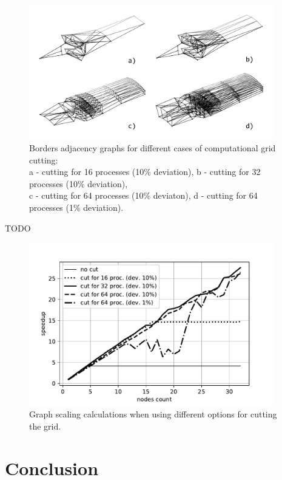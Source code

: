 \documentclass[
11pt,%
tightenlines,%
twoside,%
onecolumn,%
nofloats,%
nobibnotes,%
nofootinbib,%
superscriptaddress,%
noshowpacs,%
centertags]%
{revtex4}
\begin{document}
\begin{figure}[h]
\setcaptionmargin{5mm}
\onelinecaptionsfalse
\includegraphics[width=0.95\textwidth]{pics/g_36_2.pdf}
\caption{Borders adjacency graphs for different cases of computational grid cutting: \\ a - cutting for 16 processes (10\% deviation), b - cutting for 32 processes (10\% deviation), \\ c - cutting for 64 processes (10\% deviaton), d - cutting for 64 processes (1\% deviation).}
\label{fig:g_36_2}
\end{figure}

TODO

\begin{figure}[h]
\setcaptionmargin{5mm}
\onelinecaptionstrue
\includegraphics[width=0.95\textwidth]{pics/plot_36_scaling_2.pdf}
\caption{Graph scaling calculations when using different options for cutting the grid.}
\label{fig:plot_36_scaling_2}
\end{figure}

\section{Conclusion}
\end{document}
